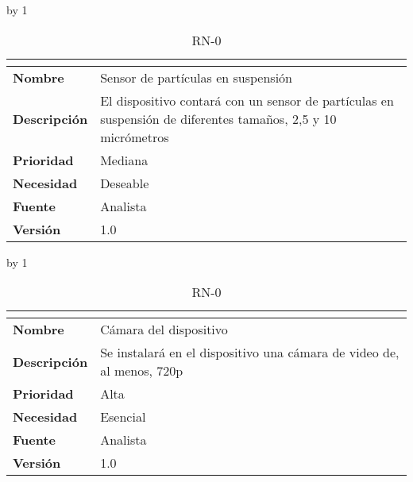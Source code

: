 \advance\rn by 1
\begin{table}[H]
	\caption{RN-0\number\rn}
	\begin{tabular}{|l|p{}|}
		\hline
		\multicolumn{2}{|c|}{\cellcolor[HTML]{BFBFBF}{\color[HTML]{000000} \textbf{RN-0\number\rn}}} \\ \hline
		\textbf{Nombre}      & Sensor de partículas en suspensión                                                                           \\ \hline
		\textbf{Descripción} & El dispositivo contará con un sensor de partículas en suspensión de diferentes tamaños, 2,5 y 10 micrómetros \\ \hline
		\textbf{Prioridad}   & Mediana                                                                                                      \\ \hline
		\textbf{Necesidad}   & Deseable                                                                                                     \\ \hline
		\textbf{Fuente}      & Analista                                                                                                     \\ \hline
		\textbf{Versión}     & 1.0                                                                                                          \\ \hline
	\end{tabular}
\end{table}
\advance\rn by 1
\begin{table}[H]
	\caption{RN-0\number\rn}
	\begin{tabular}{|l|p{}|}
		\hline
		\multicolumn{2}{|c|}{\cellcolor[HTML]{BFBFBF}{\color[HTML]{000000} \textbf{RN-0\number\rn}}} \\ \hline
		\textbf{Nombre}      & Cámara del dispositivo                                                \\ \hline
		\textbf{Descripción} & Se instalará en el dispositivo una cámara de video de, al menos, 720p \\ \hline
		\textbf{Prioridad}   & Alta                                                                  \\ \hline
		\textbf{Necesidad}   & Esencial                                                              \\ \hline
		\textbf{Fuente}      & Analista                                                              \\ \hline
		\textbf{Versión}     & 1.0                                                                   \\ \hline
	\end{tabular}
\end{table}
